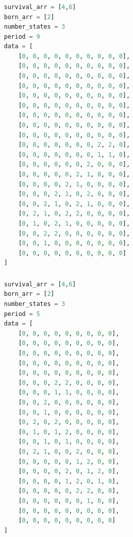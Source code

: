 \documentclass[12pt]{article}
\numberwithin{figure}{section} %
\begin{document}
\subsubsection{}
\begin{lstlisting}[language = Python]
survival_arr = [4,6]
born_arr = [2]
number_states = 3
period = 9
data = [
    [0, 0, 0, 0, 0, 0, 0, 0, 0, 0],
    [0, 0, 0, 0, 0, 0, 0, 0, 0, 0],
    [0, 0, 0, 0, 0, 0, 0, 0, 0, 0],
    [0, 0, 0, 0, 0, 0, 0, 0, 0, 0],
    [0, 0, 0, 0, 0, 0, 0, 0, 0, 0],
    [0, 0, 0, 0, 0, 0, 0, 0, 0, 0],
    [0, 0, 0, 0, 0, 0, 0, 0, 0, 0],
    [0, 0, 0, 0, 0, 0, 0, 0, 0, 0],
    [0, 0, 0, 0, 0, 0, 0, 0, 0, 0],
    [0, 0, 0, 0, 0, 0, 0, 2, 2, 0],
    [0, 0, 0, 0, 0, 0, 0, 1, 1, 0],
    [0, 0, 0, 0, 0, 0, 2, 0, 0, 0],
    [0, 0, 0, 0, 0, 2, 1, 0, 0, 0],
    [0, 0, 0, 0, 2, 1, 0, 0, 0, 0],
    [0, 0, 0, 2, 1, 0, 2, 0, 0, 0],
    [0, 0, 2, 1, 0, 2, 1, 0, 0, 0],
    [0, 2, 1, 0, 2, 2, 0, 0, 0, 0],
    [0, 1, 0, 2, 1, 0, 0, 0, 0, 0],
    [0, 0, 2, 2, 0, 0, 0, 0, 0, 0],
    [0, 0, 1, 0, 0, 0, 0, 0, 0, 0],
    [0, 0, 0, 0, 0, 0, 0, 0, 0, 0]
]
\end{lstlisting}

\subsubsection{}
\begin{lstlisting}[language = Python]
survival_arr = [4,6]
born_arr = [2]
number_states = 3
period = 5
data = [
    [0, 0, 0, 0, 0, 0, 0, 0, 0],
    [0, 0, 0, 0, 0, 0, 0, 0, 0],
    [0, 0, 0, 0, 0, 0, 0, 0, 0],
    [0, 0, 0, 0, 0, 0, 0, 0, 0],
    [0, 0, 0, 0, 0, 0, 0, 0, 0],
    [0, 0, 0, 2, 2, 0, 0, 0, 0],
    [0, 0, 0, 1, 1, 0, 0, 0, 0],
    [0, 0, 2, 0, 0, 0, 0, 0, 0],
    [0, 0, 1, 0, 0, 0, 0, 0, 0],
    [0, 2, 0, 2, 0, 0, 0, 0, 0],
    [0, 1, 0, 1, 2, 0, 0, 0, 0],
    [0, 0, 1, 0, 1, 0, 0, 0, 0],
    [0, 2, 1, 0, 0, 2, 0, 0, 0],
    [0, 0, 0, 0, 0, 1, 2, 0, 0],
    [0, 0, 0, 0, 2, 0, 1, 2, 0],
    [0, 0, 0, 0, 1, 2, 0, 1, 0],
    [0, 0, 0, 0, 0, 2, 2, 0, 0],
    [0, 0, 0, 0, 0, 0, 1, 0, 0],
    [0, 0, 0, 0, 0, 0, 0, 0, 0],
    [0, 0, 0, 0, 0, 0, 0, 0, 0]
]
\end{lstlisting}
\end{document}
